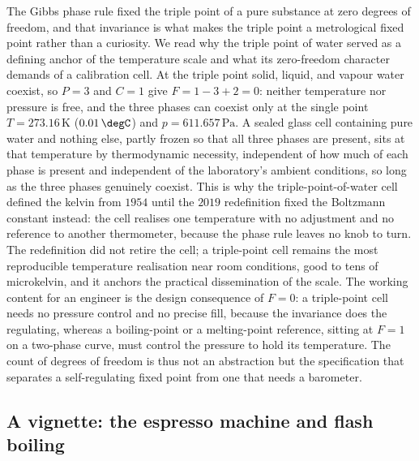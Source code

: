 The Gibbs phase rule fixed the triple point of a pure substance at zero
degrees of freedom, and that invariance is what makes the triple point a
metrological fixed point rather than a curiosity. We read why the triple
point of water served as a defining anchor of the temperature scale and what
its zero-freedom character demands of a calibration cell. At the triple point
solid, liquid, and vapour water coexist, so $P = 3$ and $C = 1$ give $F = 1 -
3 + 2 = 0$: neither temperature nor pressure is free, and the three phases
can coexist only at the single point $T = 273.16\,\si{\kelvin}$ ($0.01\,
\degC$) and $p = 611.657\,\text{Pa}$. A sealed glass cell containing pure
water and nothing else, partly frozen so that all three phases are present,
sits at that temperature by thermodynamic necessity, independent of how much
of each phase is present and independent of the laboratory's ambient
conditions, so long as the three phases genuinely coexist. This is why the
triple-point-of-water cell defined the kelvin from $1954$ until the $2019$
redefinition fixed the Boltzmann constant instead: the cell realises one
temperature with no adjustment and no reference to another thermometer,
because the phase rule leaves no knob to turn. The redefinition did not
retire the cell; a triple-point cell remains the most reproducible temperature
realisation near room conditions, good to tens of microkelvin, and it anchors
the practical dissemination of the scale. The working content for an engineer
is the design consequence of $F = 0$: a triple-point cell needs no pressure
control and no precise fill, because the invariance does the regulating,
whereas a boiling-point or a melting-point reference, sitting at $F = 1$ on a
two-phase curve, must control the pressure to hold its temperature. The count
of degrees of freedom is thus not an abstraction but the specification that
separates a self-regulating fixed point from one that needs a barometer.

\subsection{A vignette: the espresso machine and flash boiling}

